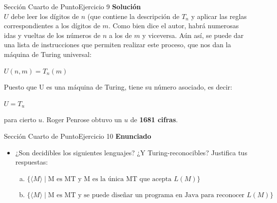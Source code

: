 \documentclass[10pt, envcountsect, presentation, aspectratio=169]{beamer}
\begin{document}
\begin{frame}{Sección Cuarto de Punto}{Ejercicio 9}
    \textbf{Solución}\\
    $U$ debe leer los dígitos de $n$ (que contiene la descripción de $T_n$ y aplicar las reglas correspondientes a los dígitos de $m$. 
    \vspace{2mm}
    Como bien dice el autor, habrá numerosas idas y vueltas de los números de $n$ a los de $m$ y viceversa. Aún así, se puede dar una lista de instrucciones que permiten realizar este proceso, que nos dan la máquina de Turing universal:

    \begin{center}
        $U(n,m) = T_n(m)$
    \end{center}

    Puesto que U es una máquina de Turing, tiene su número asociado, es decir:
    \begin{center}
        $U = T_u$
    \end{center}
    para cierto $u$. Roger Penrose obtuvo un $u$ de \textbf{1681 cifras}.
    
\end{frame}


\begin{frame}{Sección Cuarto de Punto}{Ejercicio 10}
    \textbf{Enunciado}
    \begin{itemize}
        \item ¿Son decidibles los siguientes lenguajes? ¿Y Turing-reconocibles? Justifica tus respuestas:
        \begin{enumerate}[a)]
            \item  $\{\langle M \rangle \mid \mbox{M es MT y  M es la única MT que acepta } L(M)\}$ 
            \item $\{\langle M \rangle \mid \mbox{M es MT  y  se puede diseñar un programa en Java para reconocer } L(M)\}$
        \end{enumerate}
    \end{itemize}
\end{frame}

\end{document}

